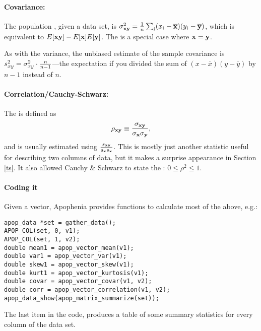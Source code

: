 \paragraph{Covariance:} The population , given a data set,
is $\sigma^2_{{\bf x}{\bf y}} = {1\over n}\sum_i(x_i-\overline {{\bf x}})(y_i-\overline {{\bf y}})$, which is equivalent
to $E[{\bf x}{\bf y}]-E[{\bf x}]E[{\bf y}]$. The  is a special case where ${\bf x}={\bf y}$.

As with the variance, the unbiased estimate of the 
sample covariance is $s^2_{xy}=\sigma^2_{xy}\cdot {n\over n-1}$---the
expectation if you  divided the sum of $(x-\overline x)(y-\overline y)$ by
$n-1$ instead of $n$.

\paragraph{Correlation/Cauchy-Schwarz:} The  is
defined as $$\rho_{\xv\yv}\equiv{\sigma_{\xv\yv}\over \sigma_\xv
\sigma_\yv},$$ and is usually estimated using ${s_{{\bf x}{\bf y}}\over
s_{\bf x} s_{\bf x}}$.  This is mostly just another statistic useful for
describing two columns of data, but it makes a surprise appearance
in Section \ref{ts}. It also allowed Cauchy \& Schwarz to state
the : $0\leq \rho^2 \leq 1$.
\label{correlation}

\paragraph{Coding it} Given a vector, Apophenia provides functions to
calculate most of the above, e.g.:

 
 
\begin{lstlisting}
apop_data *set = gather_data();
APOP_COL(set, 0, v1);
APOP_COL(set, 1, v2);
double mean1 = apop_vector_mean(v1);
double var1 = apop_vector_var(v1);
double skew1 = apop_vector_skew(v1);
double kurt1 = apop_vector_kurtosis(v1);
double covar = apop_vector_covar(v1, v2);
double corr = apop_vector_correlation(v1, v2);
apop_data_show(apop_matrix_summarize(set));
\end{lstlisting}
The last item in the code,  produces a table of
some summary statistics for every column of the data set.

